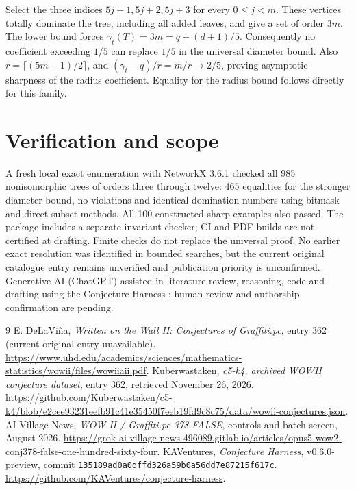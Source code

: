 \documentclass[11pt]{article}
\begin{document}
Select the three indices $5j+1,5j+2,5j+3$ for every $0\le j<m$. These vertices totally dominate the tree, including all added leaves, and give a set of order $3m$. The lower bound forces $\gamma_t(T)=3m=q+(d+1)/5$. Consequently no coefficient exceeding $1/5$ can replace $1/5$ in the universal diameter bound. Also $r=\lceil(5m-1)/2\rceil$, and $(\gamma_t-q)/r=m/r\to2/5$, proving asymptotic sharpness of the radius coefficient. Equality for the radius bound follows directly for this family.
\section{Verification and scope}
A fresh local exact enumeration with NetworkX 3.6.1 checked all 985 nonisomorphic trees of orders three through twelve: 465 equalities for the stronger diameter bound, no violations and identical domination numbers using bitmask and direct subset methods. All 100 constructed sharp examples also passed. The package includes a separate invariant checker; CI and PDF builds are not certified at drafting. Finite checks do not replace the universal proof. No earlier exact resolution was identified in bounded searches, but the current original catalogue entry remains unverified and publication priority is unconfirmed. Generative AI (ChatGPT) assisted in literature review, reasoning, code and drafting using the Conjecture Harness \cite{harness}; human review and authorship confirmation are pending.
\begin{thebibliography}{9}
 E. DeLaVi\~na, \emph{Written on the Wall II: Conjectures of Graffiti.pc}, entry 362 (current original entry unavailable). \url{https://www.uhd.edu/academics/sciences/mathematics-statistics/wowii/files/wowiiaii.pdf}.
 Kuberwastaken, \emph{c5-k4, archived WOWII conjecture dataset}, entry 362, retrieved November 26, 2026. \url{https://github.com/Kuberwastaken/c5-k4/blob/e2cee93231eefb91c41e35450f7eeb19fd9c8c75/data/wowii-conjectures.json}.
 AI Village News, \emph{WOW II / Graffiti.pc 378 FALSE}, controls and batch screen, August 2026. \url{https://grok-ai-village-news-496089.gitlab.io/articles/opus5-wow2-conj378-false-one-hundred-sixty-four}.
 KAVentures, \emph{Conjecture Harness}, v0.6.0-preview, commit \texttt{135189ad0a0dffd326a59b0a56dd7e87215f617c}. \url{https://github.com/KAVentures/conjecture-harness}.
\end{thebibliography}
\end{document}
